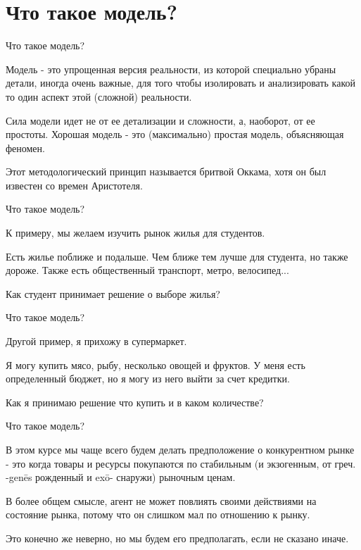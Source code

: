 \documentclass{beamer}
\begin{document}
\section{Что такое модель?}

\begin{frame}{Что такое модель?}

Модель - это упрощенная версия реальности, из которой специально убраны детали, иногда очень важные, для того чтобы изолировать и анализировать какой то один аспект этой (сложной) реальности. 

Сила модели идет не от ее детализации и сложности, а, наоборот, от ее простоты. Хорошая модель - это (максимально) простая модель, объясняющая феномен. 

Этот методологический принцип называется бритвой Оккама, хотя он был известен со времен Аристотеля.

\end{frame}

\begin{frame}{Что такое модель?}

К примеру, мы желаем изучить рынок жилья для студентов. 

Есть жилье поближе и подальше. Чем ближе тем лучше для студента, но также дороже. Также есть общественный транспорт, метро, велосипед...

Как студент принимает решение о выборе жилья?

\end{frame}

\begin{frame}{Что такое модель?}

Другой пример, я прихожу в супермаркет. 

Я могу купить мясо, рыбу, несколько овощей и фруктов. У меня есть определенный бюджет, но я могу из него выйти за счет кредитки.

Как я принимаю решение что купить и в каком количестве?

\end{frame}

\begin{frame}{Что такое модель?}

В этом курсе мы чаще всего будем делать предположение о \alert{конкурентном рынке} - это когда товары и ресурсы покупаются по стабильным (и \alert{экзогенным}, от греч. -genēs рожденный и  exō- снаружи) рыночным ценам. 

В более общем смысле, агент не может повлиять своими действиями на состояние рынка, потому что он слишком мал по отношению к рынку.

Это конечно же неверно, но мы будем его предполагать, если не сказано иначе.

\end{frame}
\end{document}
